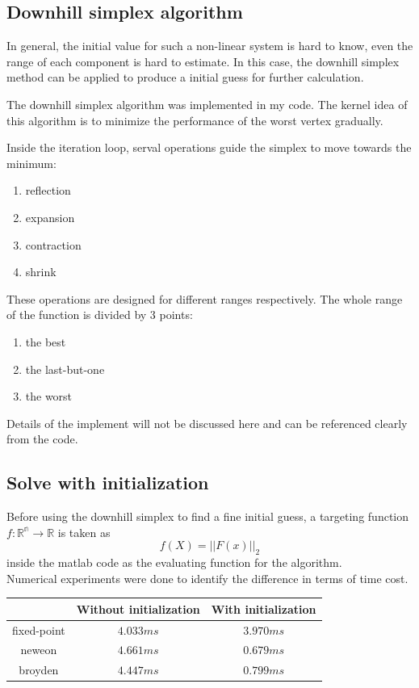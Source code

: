 \documentclass[paper=a4, fontsize=11pt]{scrartcl} %
\numberwithin{equation}{section} %
\numberwithin{figure}{section} %
\numberwithin{table}{section} %
\begin{document}
	\subsection{Downhill simplex algorithm}
		In general, the initial value for such a non-linear system is hard to know, even the range of each component is hard to estimate. In this case, the downhill simplex method can be applied to produce a initial guess for further calculation.
		
		The downhill simplex algorithm was implemented in my code. The kernel idea of this algorithm is to minimize the performance of the worst vertex gradually. 
		
		Inside the iteration loop, serval operations guide the simplex to move towards the minimum:
		\begin{enumerate}
			\item reflection
			\item expansion
			\item contraction
			\item shrink
		\end{enumerate}
		
		 These operations are designed for different ranges respectively. The whole range of the function is divided by 3 points: 
		 \begin{enumerate}
		 	\item  the best
		 	\item  the last-but-one
		 	\item  the worst
		 \end{enumerate}
 		 Details of the implement will not be discussed here and can be referenced clearly from the code.
		
	\subsection{Solve with initialization}
		Before using the downhill simplex to find a fine initial guess, a targeting function $f: \mathbb{R^n} \rightarrow \mathbb{R}$ is taken as
		\begin{equation}
			f(X) = ||F(x)||_2
		\end{equation}
		inside the matlab code as the evaluating function for the algorithm.\\
		Numerical experiments were done to identify the difference in terms of time cost. 
		
		\begin{center}
			\begin{tabular}{ccc}
				\hline
				\quad       & Without initialization & With initialization\\
				\hline
				fixed-point & $4.033 ms$             & $3.970 ms$\\
				neweon      & $4.661 ms$             & $0.679 ms$\\
				broyden     & $4.447 ms$             & $0.799 ms$\\
				\hline
			\end{tabular}
		\end{center}
		
\end{document}
